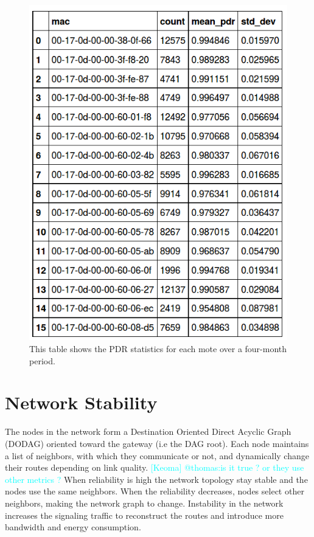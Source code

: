 \documentclass{sig-alternate}
\newcommand{\keoma}[1]              {\textcolor{cyan}{[Keoma] #1}}
\begin{document}
\begin{figure}
    \centering
    \includegraphics[width=0.9\columnwidth]{stats_reliability}
    \caption{This table shows the PDR statistics for each mote over a four-month period.}
    \label{fig:stats_reliability}
\end{figure}

\section{Network Stability}
\label{sec:net_stability}


The nodes in the network form a Destination Oriented Direct Acyclic Graph (DODAG) oriented toward the gateway (i.e the DAG root).
Each node maintains a list of neighbors, with which they communicate or not, and dynamically change their routes depending on link quality. \keoma{@thomas:is it true ? or they use other metrics ?}
When reliability is high the network topology stay stable and the nodes use the same neighbors.
When the reliability decreases, nodes select other neighbors, making the network graph to change.
Instability in the network increases the signaling traffic to reconstruct the routes and introduce more bandwidth and energy consumption.
\end{document}
